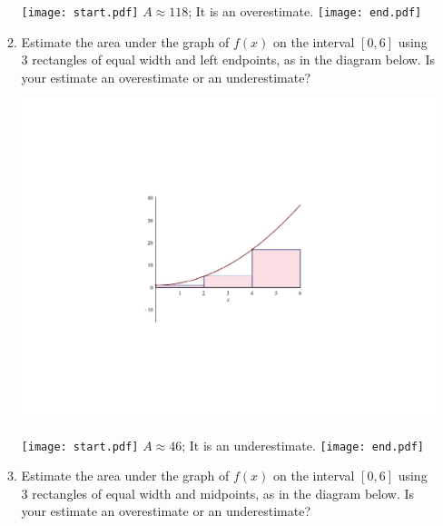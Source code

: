 \documentclass[12pt]{article}
\begin{document}
\begin{enumerate}
\begin{enumerate}
\begin{center}
\end{center}

\texttt{[image: start.pdf]}
{{$A \approx 118$; It is an overestimate.}}
\texttt{[image: end.pdf]}


\item Estimate the area under the graph of $f(x)$ on the interval $[0,6]$ using 3 rectangles of equal width and left endpoints, as in the diagram below.  Is your estimate an overestimate or an underestimate?

\begin{center}

\includegraphics[scale=0.45]{x2+1left.pdf}

\end{center}

\texttt{[image: start.pdf]}
{{$A \approx 46$; It is an underestimate.}}
\texttt{[image: end.pdf]}


\item Estimate the area under the graph of $f(x)$ on the interval $[0,6]$ using 3 rectangles of equal width and midpoints, as in the diagram below.  Is your estimate an overestimate or an underestimate?

\begin{center}


\end{center}
\end{enumerate}
\end{enumerate}
\end{document}
